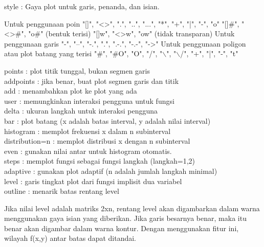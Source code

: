 \documentclass[a4paper,10pt]{article}
\begin{document}
\begin{eulernotebook}
\begin{eulercomment}
\begin{eulercomment}
\begin{eulercomment}
\begin{eulercomment}
\begin{eulercomment}
\begin{eulercomment}
\begin{eulercomment}
\begin{eulercomment}
\begin{eulercomment}
\begin{eulercomment}
\begin{eulercomment}
\begin{eulercomment}
\begin{eulercomment}
style     : Gaya plot untuk garis, penanda, dan isian.\\
\end{eulercomment}
\begin{eulerttcomment}
            Untuk penggunaan poin
            "[]", "<>", ".", "..", "...",
            "*", "+", "|", "-", "o"
            "[]#", "<>#", "o#" (bentuk terisi)
            "[]w", "<>w", "ow" (tidak transparan)
            Untuk penggunaan garis
            "-", "--", "-.", ".", ".-.", "-.-", "->"
            Untuk penggunaan poligon atau plot batang yang terisi
            "#", "#O", "O", "/", "\(\backslash\)", "\(\backslash\)/",
            "+", "|", "-", "t"
\end{eulerttcomment}
\begin{eulercomment}
points    : plot titik tunggal, bukan segmen garis\\
addpoints : jika benar, buat plot segmen garis dan titik\\
add       : menambahkan plot ke plot yang ada\\
user      : memungkinkan interaksi pengguna untuk fungsi\\
delta     : ukuran langkah untuk interaksi pengguna\\
bar       : plot batang (x adalah batas interval, y adalah nilai
interval)\\
histogram : memplot frekuensi x dalam n subinterval\\
distribution=n : memplot distribusi x dengan n subinterval\\
even      : gunakan nilai antar untuk histogram otomatis.\\
steps     : memplot fungsi sebagai fungsi langkah (langkah=1,2)\\
adaptive  : gunakan plot adaptif (n adalah jumlah langkah minimal)\\
level     : garis tingkat plot dari fungsi implisit dua variabel\\
outline   : menarik batas rentang level

Jika nilai level adalah matriks 2xn, rentang level akan digambarkan
dalam warna menggunakan gaya isian yang diberikan. Jika garis besarnya
benar, maka itu benar akan digambar dalam warna kontur. Dengan
menggunakan fitur ini, wilayah f(x,y) antar batas dapat ditandai.


\end{eulercomment}
\end{eulercomment}
\end{eulercomment}
\end{eulercomment}
\end{eulercomment}
\end{eulercomment}
\end{eulercomment}
\end{eulercomment}
\end{eulercomment}
\end{eulercomment}
\end{eulercomment}
\end{eulercomment}
\end{eulercomment}
\end{eulernotebook}
\end{document}
